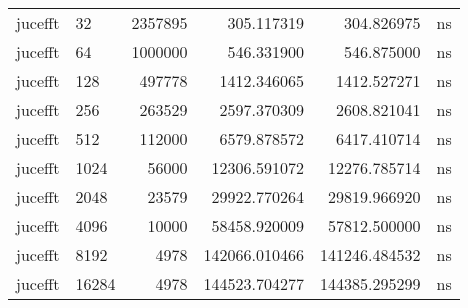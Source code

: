 \begin{tabular}{llrrrl}
jucefft & 32 & 2357895 & 305.117319 & 304.826975 & ns \\
jucefft & 64 & 1000000 & 546.331900 & 546.875000 & ns \\
jucefft & 128 & 497778 & 1412.346065 & 1412.527271 & ns \\
jucefft & 256 & 263529 & 2597.370309 & 2608.821041 & ns \\
jucefft & 512 & 112000 & 6579.878572 & 6417.410714 & ns \\
jucefft & 1024 & 56000 & 12306.591072 & 12276.785714 & ns \\
jucefft & 2048 & 23579 & 29922.770264 & 29819.966920 & ns \\
jucefft & 4096 & 10000 & 58458.920009 & 57812.500000 & ns \\
jucefft & 8192 & 4978 & 142066.010466 & 141246.484532 & ns \\
jucefft & 16284 & 4978 & 144523.704277 & 144385.295299 & ns \\
\bottomrule
\end{tabular}
